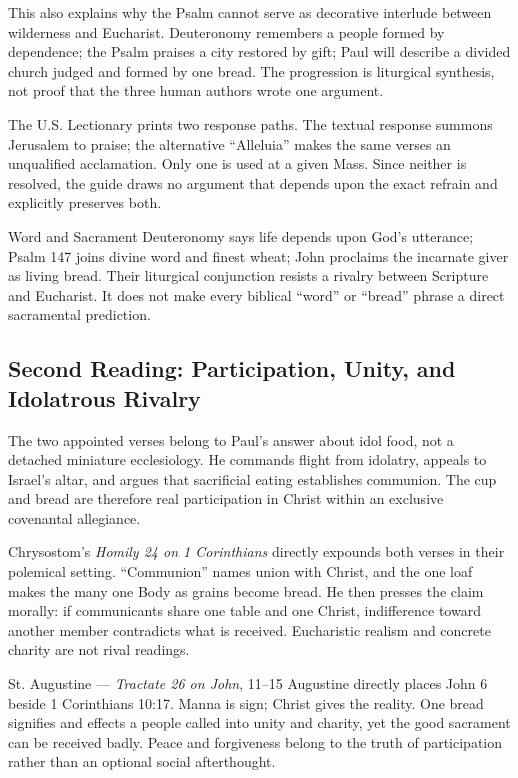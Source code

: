 \begin{deepstudy}
This also explains why the Psalm cannot serve as decorative interlude between wilderness and Eucharist. Deuteronomy remembers a people formed by dependence; the Psalm praises a city restored by gift; Paul will describe a divided church judged and formed by one bread. The progression is liturgical synthesis, not proof that the three human authors wrote one argument.

The U.S. Lectionary prints two response paths. The textual response summons Jerusalem to praise; the alternative “Alleluia” makes the same verses an unqualified acclamation. Only one is used at a given Mass. Since neither is resolved, the guide draws no argument that depends upon the exact refrain and explicitly preserves both.

\begin{studybox}{Word and Sacrament}
Deuteronomy says life depends upon God's utterance; Psalm 147 joins divine word and finest wheat; John proclaims the incarnate giver as living bread. Their liturgical conjunction resists a rivalry between Scripture and Eucharist. It does not make every biblical “word” or “bread” phrase a direct sacramental prediction.
\end{studybox}

\subsection*{Second Reading: Participation, Unity, and Idolatrous Rivalry\enspace{}}

The two appointed verses belong to Paul's answer about idol food, not a detached miniature ecclesiology. He commands flight from idolatry, appeals to Israel's altar, and argues that sacrificial eating establishes communion. The cup and bread are therefore real participation in Christ within an exclusive covenantal allegiance.

Chrysostom's \emph{Homily 24 on 1 Corinthians} directly expounds both verses in their polemical setting. “Communion” names union with Christ, and the one loaf makes the many one Body as grains become bread. He then presses the claim morally: if communicants share one table and one Christ, indifference toward another member contradicts what is received. Eucharistic realism and concrete charity are not rival readings.

\begin{sourcecard}{St. Augustine --- \emph{Tractate 26 on John}, 11--15}
Augustine directly places John 6 beside 1 Corinthians 10:17. Manna is sign; Christ gives the reality. One bread signifies and effects a people called into unity and charity, yet the good sacrament can be received badly. Peace and forgiveness belong to the truth of participation rather than an optional social afterthought.
\end{sourcecard}


\end{deepstudy}
